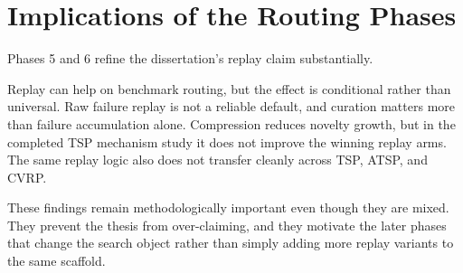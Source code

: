\section{Implications of the Routing Phases}
\label{sec:routing-implications}

Phases 5 and 6 refine the dissertation's replay claim substantially.

Replay can help on benchmark routing, but the effect is conditional rather than universal. Raw
failure replay is not a reliable default, and curation matters more than failure accumulation
alone. Compression reduces novelty growth, but in the completed TSP mechanism study it does not
improve the winning replay arms. The same replay logic also does not transfer cleanly across TSP,
ATSP, and CVRP.

These findings remain methodologically important even though they are mixed. They prevent the thesis from
over-claiming, and they motivate the later phases that change the search object rather than simply
adding more replay variants to the same scaffold.
